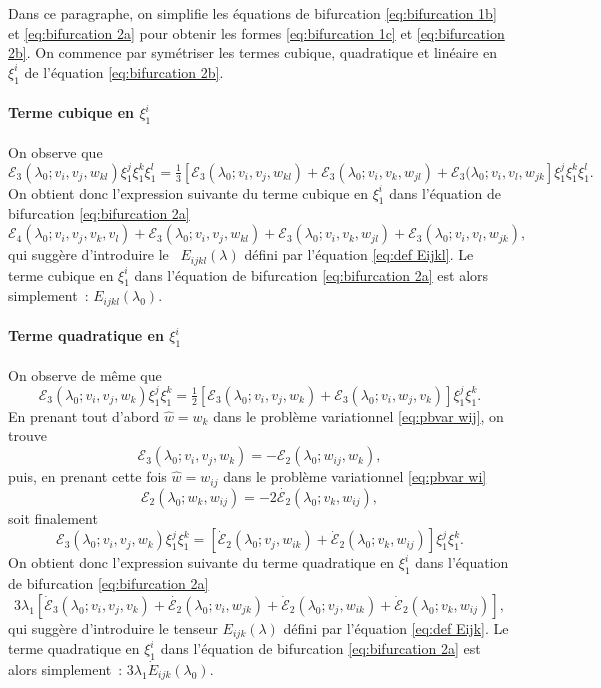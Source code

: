 \documentclass{article}
\begin{document}
Dans ce paragraphe, on simplifie les équations de bifurcation
\eqref{eq:bifurcation 1b} et \eqref{eq:bifurcation 2a} pour obtenir les formes
\eqref{eq:bifurcation 1c} et \eqref{eq:bifurcation 2b}. On commence par
symétriser les termes cubique, quadratique et linéaire en $\xi_1^i$ de
l'équation \eqref{eq:bifurcation 2b}.

\paragraph{Terme cubique en $\xi_1^i$}On observe que
\[ \mathcal{E}_3 (\lambda_0 ; v_i, v_j, w_{k  l}) \xi_1^j \xi_1^k
   \xi_1^l = \text{} \tfrac{1}{3}  [\mathcal{E}_3 (\lambda_0 ; v_i, v_j, w_{k
    l})  +\mathcal{E}_3 (\lambda_0 ; v_i, v_k, w_{j
   l}) +\mathcal{E}_3 (\lambda_0 ; v_i, v_l, w_{j  k}] \xi_1^j \xi_1^k
   \xi_1^l . \]
On obtient donc l'expression suivante du terme cubique en $\xi_1^i$ dans
l'équation de bifurcation \eqref{eq:bifurcation 2a}
\[ \mathcal{E}_4 (\lambda_0 ; v_i, v_j, v_k, v_l) +\mathcal{E}_3 (\lambda_0 ;
   v_i, v_j, w_{k  l}) +\mathcal{E}_3 (\lambda_0 ; v_i, v_k, w_{j
    l}) +\mathcal{E}_3 (\lambda_0 ; v_i, v_l, w_{j  k}), \]
qui suggère d'introduire le \ $E_{i  j  k  l}
(\lambda)$ défini par l'équation \eqref{eq:def Eijkl}. Le terme
cubique en $\xi_1^i$ dans l'équation de bifurcation \eqref{eq:bifurcation
2a} est alors simplement~: $E_{i  j  k  l}
(\lambda_0)$.

\paragraph{Terme quadratique en $\xi_1^i$}On observe de même que
\[ \mathcal{E}_3 (\lambda_0 ; v_i, v_j, w_k) \xi_1^j \xi_1^k = \tfrac{1}{2}
   [\mathcal{E}_3 (\lambda_0 ; v_i, v_j, w_k) +\mathcal{E}_3 (\lambda_0 ; v_i,
   w_j, v_k)] \xi_1^j \xi_1^k . \]
En prenant tout d'abord $\widehat{w} = w_k$ dans le problème variationnel
\eqref{eq:pbvar wij}, on trouve
\[ \mathcal{E}_3 (\lambda_0 ; v_i, v_j, w_k) = -\mathcal{E}_2 (\lambda_0 ;
   w_{i  j}, w_k), \]
puis, en prenant cette fois $\hat{w} = w_{i  j}$ dans le problème
variationnel \eqref{eq:pbvar wi}
\[ \mathcal{E}_2 (\lambda_0 ; w_k, w_{i  j}) = - 2 \dot{\mathcal{E}_2}
   (\lambda_0 ; v_k, w_{i  j}), \]
soit finalement
\[ \mathcal{E}_3 (\lambda_0 ; v_i, v_j, w_k) \xi_1^j \xi_1^k =
   [\dot{\mathcal{E}}_2 (\lambda_0 ; v_j, w_{i  k}) +
   \dot{\mathcal{E}}_2 (\lambda_0 ; v_k, w_{i  j})] \xi_1^j \xi_1^k .
\]
On obtient donc l'expression suivante du terme quadratique en $\xi_1^i$ dans
l'équation de bifurcation \eqref{eq:bifurcation 2a}
\[ 3 \lambda_1  [\dot{\mathcal{E}}_3 (\lambda_0 ; v_i, v_j, v_k) +
   \dot{\mathcal{E}_2} (\lambda_0 ; v_i, w_{j  k}) +
   \dot{\mathcal{E}}_2 (\lambda_0 ; v_j, w_{i  k}) +
   \dot{\mathcal{E}}_2 (\lambda_0 ; v_k, w_{i  j})], \]
qui suggère d'introduire le tenseur $E_{i  j  k}
(\lambda)$ défini par l'équation \eqref{eq:def Eijk}. Le terme
quadratique en $\xi_1^i$ dans l'équation de bifurcation
\eqref{eq:bifurcation 2a} est alors simplement~: $3 \lambda_1  \dot{E}_{i
 j  k} (\lambda_0)$.
\end{document}
